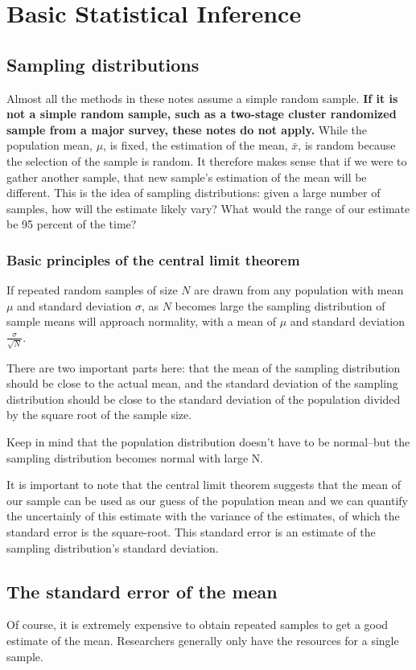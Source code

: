 \chapter{Basic Statistical Inference}
\label{sec:inference}
\section{Sampling distributions}
Almost all the methods in these notes assume a simple random sample. {\bf If it is not a simple random sample, such as a two-stage cluster randomized sample from a major survey, these notes do not apply.} While the population mean, $\mu$, is fixed, the estimation of the mean, $\bar{x}$, is random because the selection of the sample is random. It therefore makes sense that if we were to gather another sample, that new sample's estimation of the mean will be different. This is the idea of sampling distributions: given a large number of samples, how will the estimate likely vary? What would the range of our estimate be 95 percent of the time?

\subsection{Basic principles of the central limit theorem}
If repeated random samples of size $N$ are drawn from any population with mean $\mu$ and standard deviation $\sigma$, as $N$ becomes large the sampling distribution of sample means will approach normality, with a mean of $\mu$ and standard deviation $\frac{\sigma}{\sqrt{N}}$.

There are two important parts here: that the mean of the sampling distribution should be close to the actual mean, and the standard deviation of the sampling distribution should be close to the standard deviation of the population divided by the square root of the sample size.

Keep in mind that the population distribution doesn't have to be normal--but the sampling distribution becomes normal with large N.

It is important to note that the central limit theorem suggests that the mean of our sample can be used as our guess of the population mean and we can quantify the uncertainly of this estimate with the variance of the estimates, of which the standard error is the square-root. This standard error is an estimate of the sampling distribution's standard deviation.

\section{The standard error of the mean}
Of course, it is extremely expensive to obtain repeated samples to get a good estimate of the mean. Researchers generally only have the resources for a single sample.

